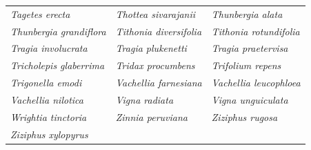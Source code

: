 \documentclass[runningheads]{llncs}
\begin{document}
\begin{longtable}{lll}
\textit{Tagetes erecta} & \textit{Thottea sivarajanii} & \textit{Thunbergia alata} \\
\textit{Thunbergia grandiflora} & \textit{Tithonia diversifolia} & \textit{Tithonia rotundifolia} \\
\textit{Tragia involucrata} & \textit{Tragia plukenetti} & \textit{Tragia praetervisa} \\
\textit{Tricholepis glaberrima} & \textit{Tridax procumbens} & \textit{Trifolium repens} \\
\textit{Trigonella emodi} & \textit{Vachellia farnesiana} & \textit{Vachellia leucophloea} \\
\textit{Vachellia nilotica} & \textit{Vigna radiata} & \textit{Vigna unguiculata} \\
\textit{Wrightia tinctoria} & \textit{Zinnia peruviana} & \textit{Ziziphus rugosa} \\
\textit{Ziziphus xylopyrus} &  &  \\

\end{longtable}
\end{document}
